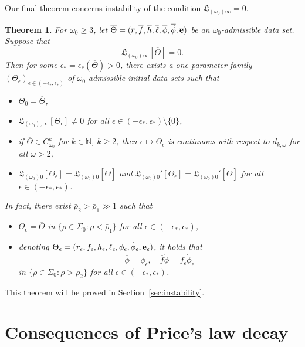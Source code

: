 \documentclass[10pt, reqno]{amsart}
\newtheorem{theorem}{Theorem}[section]
\theoremstyle{definition}
\theoremstyle{remark}
\theoremstyle{conjecture}
\numberwithin{equation}{section}
\newcommand{\set}[1]{\{#1\}}
\newcommand{\0}{\emptyset}
\newcommand{\eps}{\epsilon}
\newcommand{\Sgm}{\Sigma}
\newcommand{\Tht}{\Theta}
\newcommand{\omg}{\omega}
\newcommand{\bfe}{{\bf e}}
\newcommand{\e}{\bfe}							%
\newcommand{\phibg}{\overline{\phi}}				%
\newcommand{\rbg}{\overline{r}}					%
\newcommand{\ebg}{\overline{\e}}					%
\newcommand{\fbg}{\overline{f}}
\newcommand{\hbg}{\overline{h}}
\newcommand{\ellbg}{\overline{\ell}}
\newcommand{\dphibg}{\overline{\dot{\phi}}}
\begin{document}
Our final theorem concerns instability of the condition $\mathfrak{L}_{(\omg_{0}) \infty} = 0$. 
\begin{theorem} \label{thm:instability}
For $\omg_{0} \geq 3$, let $\overline{\Tht} = (\rbg, \fbg, \hbg, \ellbg, \phibg, \dphibg, \ebg)$ be an $\omg_{0}$-admissible data set. 
Suppose that
\begin{equation*}
	\mathfrak{L}_{(\omg_{0}) \infty} [\overline{\Tht}] = 0.
\end{equation*}
Then for some $\eps_{\ast} = \eps_{\ast}(\overline{\Tht}) > 0$, there exists a one-parameter family $(\Tht_{\eps})_{\eps \in (-\eps_{\ast}, \eps_{\ast})}$ of $\omg_{0}$-admissible initial data sets such that
\begin{itemize}
\item $\Tht_{0} = \overline{\Tht}$, 
\item $\mathfrak{L}_{(\omg_{0}), \infty}[\Tht_{\eps}] \neq 0$ for all $\eps \in (-\eps_{\ast}, \eps_{\ast})\setminus\{0\}$,
\item if $\overline{\Theta}\in C^k_{\omg_0}$ for $k\in\mathbb N$, $k\geq 2$, then $\eps \mapsto \Tht_{\eps}$ is continuous with respect to $d_{k, \omg}$ for all $\omg > 2$, 
\item $\mathfrak{L}_{(\omg_{0}) 0}[\Tht_{\eps}] = \mathfrak{L}_{(\omg_{0}) 0}[\overline{\Tht}]$ and $\mathfrak{L}_{(\omg_{0}) 0}'[\Tht_{\eps}] = \mathfrak{L}_{(\omg_{0}) 0}'[\overline{\Tht}]$ for all $\eps \in (-\eps_{\ast}, \eps_{\ast})$.
\end{itemize}
In fact, there exist $\bar{\rho}_{2} > \bar{\rho}_{1} \gg 1$ such that 
\begin{itemize}
\item $\Tht_{\eps} = \overline{\Tht}$ in $\set{\rho \in \Sgm_{0} : \rho < \bar{\rho}_{1}}$ for all $\eps \in (-\eps_{\ast}, \eps_{\ast})$,
\item denoting $\Tht_\eps = (r_\eps, f_\eps, h_\eps, \ell_\eps, \phi_\eps, \dot{\phi}_\eps, \e_\eps)$, it holds that
$$\overline{\phi}=\phi_\eps,\quad\fbg\overline{\dot{\phi}}=f_\eps\dot{\phi}_\eps $$
in $\set{\rho \in \Sgm_{0} : \rho > \bar{\rho}_{2}}$ for all $\eps \in (-\eps_{\ast}, \eps_{\ast})$.
\end{itemize}
\end{theorem}
This theorem will be proved in Section~\ref{sec:instability}.

\section{Consequences of Price's law decay} \label{sec:bg}
\end{document}
